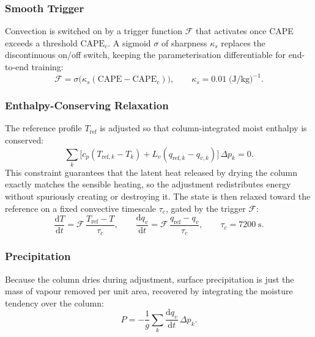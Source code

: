 \documentclass[11pt,twoside]{report}
\newcommand{\dd}{\mathrm{d}}
\newcommand{\cpd}{c_p}
\newcommand{\Lv}{L_v}
\begin{document}
\subsubsection{Smooth Trigger}

Convection is switched on by a trigger function $\mathcal{F}$ that activates
once CAPE exceeds a threshold $\mathrm{CAPE}_c$. A sigmoid $\sigma$ of
sharpness $\kappa_s$ replaces the discontinuous on/off switch, keeping the
parameterisation differentiable for end-to-end training:
\begin{equation}
  \mathcal{F} = \sigma\!\bigl(\kappa_s(\mathrm{CAPE}-\mathrm{CAPE}_c)\bigr),
  \qquad \kappa_s=0.01\;\text{(J/kg)}^{-1}.
\end{equation}

\subsubsection{Enthalpy-Conserving Relaxation}

The reference profile $T_{\mathrm{ref}}$ is adjusted so that column-integrated
moist enthalpy is conserved:
\begin{equation}
  \sum_k\bigl[\cpd(T_{\mathrm{ref},k}-T_k)
  +\Lv(q_{\mathrm{ref},k}-q_{v,k})\bigr]\,\Delta p_k = 0.
\end{equation}
This constraint guarantees that the latent heat released by drying the
column exactly matches the sensible heating, so the adjustment redistributes
energy without spuriously creating or destroying it. The state is then
relaxed toward the reference on a fixed convective timescale $\tau_c$, gated
by the trigger $\mathcal{F}$:
\begin{equation}
  \frac{\dd T}{\dd t} = \mathcal{F}\,\frac{T_{\mathrm{ref}}-T}{\tau_c},
  \qquad
  \frac{\dd q_v}{\dd t} = \mathcal{F}\,\frac{q_{\mathrm{ref}}-q_v}{\tau_c},
  \qquad \tau_c=7200\;\text{s}.
\end{equation}

\subsubsection{Precipitation}

Because the column dries during adjustment, surface precipitation is just the
mass of vapour removed per unit area, recovered by integrating the moisture
tendency over the column:
\begin{equation}
  P = -\frac{1}{g}\sum_k \frac{\dd q_v}{\dd t}\,\Delta p_k.
\end{equation}
\end{document}
